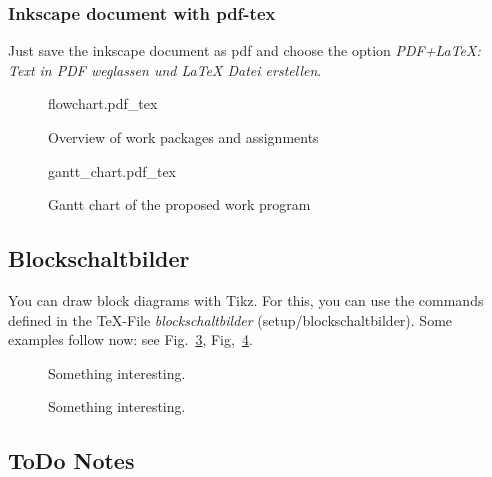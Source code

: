 \subsubsection{Inkscape document with pdf-tex}
Just save the inkscape document as pdf and choose the option \emph{PDF+LaTeX: Text in PDF weglassen und LaTeX Datei erstellen}.

\begin{figure}[ht]
	\begin{center}
		\def\svgwidth{\linewidth}\small
		{flowchart.pdf_tex}
		\caption{Overview of work packages and assignments}
		\label{fig:assignment_wp}
	\end{center}
\end{figure}

\begin{figure}[ht]
	\centering
	\def\svgwidth{\linewidth}\footnotesize
	{gantt_chart.pdf_tex}
	\caption{Gantt chart of the proposed work program}
	\label{fig:Gantt}
\end{figure}

\subsection{Blockschaltbilder}
You can draw block diagrams with Tikz. For this, you can use the commands defined in the TeX-File \emph{blockschaltbilder} (setup/blockschaltbilder). Some examples follow now: see Fig.~\ref{fig:zwei-freiheitsgrade-regelung}, Fig,~\ref{fig:zwei-freiheitsgrade-regelung-zustand}.

\begin{figure}[tp]
	\centering
	\scalebox{0.95}{
		}
	\caption{Something interesting.}
	\label{fig:zwei-freiheitsgrade-regelung}
\end{figure}

\begin{figure}[tp]
	\centering
	\scalebox{0.95}{
		}
	\caption{Something interesting.}
	\label{fig:zwei-freiheitsgrade-regelung-zustand}
\end{figure}

	

\subsection{ToDo Notes}
{}

